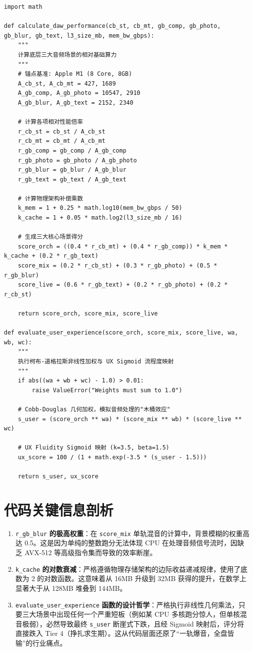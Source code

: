 \documentclass[11pt, a4paper]{article}
\begin{document}
\begin{lstlisting}[caption={DAW Performance Evaluation Engine v1.0}]
import math

def calculate_daw_performance(cb_st, cb_mt, gb_comp, gb_photo, gb_blur, gb_text, l3_size_mb, mem_bw_gbps):
    """
    计算底层三大音频场景的相对基础算力
    """
    # 锚点基准: Apple M1 (8 Core, 8GB)
    A_cb_st, A_cb_mt = 427, 1689
    A_gb_comp, A_gb_photo = 10547, 2910
    A_gb_blur, A_gb_text = 2152, 2340
    
    # 计算各项相对性能倍率
    r_cb_st = cb_st / A_cb_st
    r_cb_mt = cb_mt / A_cb_mt
    r_gb_comp = gb_comp / A_gb_comp
    r_gb_photo = gb_photo / A_gb_photo
    r_gb_blur = gb_blur / A_gb_blur
    r_gb_text = gb_text / A_gb_text
    
    # 计算物理架构补偿乘数
    k_mem = 1 + 0.25 * math.log10(mem_bw_gbps / 50)
    k_cache = 1 + 0.05 * math.log2(l3_size_mb / 16)
    
    # 生成三大核心场景得分
    score_orch = ((0.4 * r_cb_mt) + (0.4 * r_gb_comp)) * k_mem * k_cache + (0.2 * r_gb_text)
    score_mix = (0.2 * r_cb_st) + (0.3 * r_gb_photo) + (0.5 * r_gb_blur)
    score_live = (0.6 * r_gb_text) + (0.2 * r_gb_photo) + (0.2 * r_cb_st)
    
    return score_orch, score_mix, score_live

def evaluate_user_experience(score_orch, score_mix, score_live, wa, wb, wc):
    """
    执行柯布-道格拉斯非线性加权与 UX Sigmoid 流程度映射
    """
    if abs((wa + wb + wc) - 1.0) > 0.01:
        raise ValueError("Weights must sum to 1.0")
    
    # Cobb-Douglas 几何加权，模拟音频处理的"木桶效应"
    s_user = (score_orch ** wa) * (score_mix ** wb) * (score_live ** wc)
    
    # UX Fluidity Sigmoid 映射 (k=3.5, beta=1.5)
    ux_score = 100 / (1 + math.exp(-3.5 * (s_user - 1.5)))
    
    return s_user, ux_score
\end{lstlisting}

\section{代码关键信息剖析}
\begin{enumerate}
    \item \texttt{r\_gb\_blur} \textbf{的极高权重}：在 \texttt{score\_mix} 单轨混音的计算中，背景模糊的权重高达 0.5。这是因为单纯的整数跑分无法体现 CPU 在处理音频信号流时，因缺乏 AVX-512 等高级指令集而导致的效率断崖。
    \item \texttt{k\_cache} \textbf{的对数衰减}：严格遵循物理存储架构的边际收益递减规律，使用了底数为 2 的对数函数。这意味着从 16MB 升级到 32MB 获得的提升，在数学上显著大于从 128MB 堆叠到 144MB。
    \item \texttt{evaluate\_user\_experience} \textbf{函数的设计哲学}：严格执行非线性几何乘法，只要三大场景中出现任何一个严重短板（例如某 CPU 多核跑分惊人，但单核混音极弱），必然导致最终 \texttt{s\_user} 断崖式下跌，且经 Sigmoid 映射后，评分将直接跌入 Tier 4（挣扎求生期）。这从代码层面还原了“一轨爆音，全盘皆输”的行业痛点。
\end{enumerate}
\end{document}
